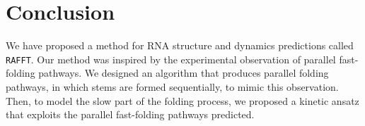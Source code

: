 \section{Conclusion}
We have proposed a method for RNA structure and dynamics predictions called \texttt{RAFFT}. Our method was inspired by the experimental observation of parallel fast-folding pathways. We designed an algorithm that produces parallel folding pathways, in which stems are formed sequentially, to mimic this observation. Then, to model the slow part of the folding process, we proposed a kinetic ansatz that exploits the parallel fast-folding pathways predicted.
